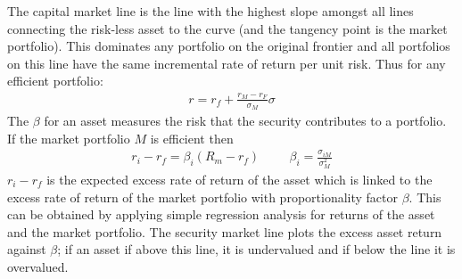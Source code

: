 \documentclass[a4paper]{article}
\begin{document}
\begin{enumerate}
The capital market line is the line with the highest slope amongst all lines connecting the risk-less asset to the curve (and the tangency point is the market portfolio). This dominates any portfolio on the original frontier and all portfolios on this line have the same incremental rate of return per unit risk.  Thus for any efficient portfolio:
\begin{align*}
r = r_f + \frac{r_M - r_F}{\sigma_M}\sigma
\end{align*}
The $\beta$ for an asset measures the risk that the security contributes to a portfolio. If the market portfolio $M$ is efficient then
\begin{align*}
r_i - r_f = \beta_i(R_m - r_f) \hspace{1cm} \beta_i = \frac{\sigma_{iM}}{\sigma_{M}^2}
\end{align*}
$r_i - r_f$ is the expected excess rate of return of the asset which is linked to the excess rate of return of the market portfolio with proportionality factor $\beta$. This can be obtained by applying simple regression analysis for returns of the asset and the market portfolio. The security market line plots the excess asset return against $\beta$; if an asset if above this line, it is undervalued and if below the line it is overvalued. 


\end{enumerate}
\end{document}
